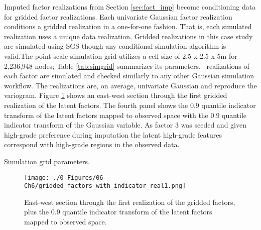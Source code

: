 Imputed factor realizations from Section \ref{sec:fact_imp} become conditioning data for gridded factor realizations. Each univariate Gaussian factor realization conditions a gridded realization in a one-for-one fashion. That is, each simulated realization uses a unique data realization. Gridded realizations in this case study are simulated using \gls{SGS} though any conditional simulation algorithm is valid.The point scale simulation grid utilizes a cell size of 2.5 x 2.5 x 5m for 2,236,948 nodes; Table \ref{tab:simgrid} summarizes its parameters. \csnreals \ realizations of each factor are simulated and checked similarly to any other Gaussian simulation workflow. The realizations are, on average, univariate Gaussian and reproduce the variogram. Figure \ref{fig:gridded_factors_with_indicator_real1} shows an east-west section through the first gridded realization of the latent factors. The fourth panel shows the 0.9 quantile indicator transform of the latent factors mapped to observed space with the 0.9 quantile indicator transform of the Gaussian variable. As factor 3 was seeded and given high-grade preference during imputation the latent high-grade features correspond with high-grade regions in the observed data.

\begin{table}[!htb]
    \centering
    \caption{Simulation grid parameters.}
    \resizebox{0.9\width}{!}{}
    \label{tab:simgrid}
\end{table}

\begin{figure}[htb!]
    \centering
    \texttt{[image: ./0-Figures/06-Ch6/gridded\_factors\_with\_indicator\_real1.png]}
    \caption{East-west section through the first realization of the gridded factors, plus the 0.9 quantile indicator transform of the latent factors mapped to observed space.}
    \label{fig:gridded_factors_with_indicator_real1}
\end{figure}


